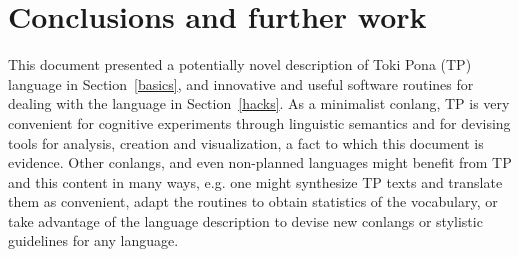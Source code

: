 \section{Conclusions and further work}\label{conc}
This document presented a potentially novel description of Toki Pona (TP)
language in Section~\ref{basics}, and innovative and useful software routines for dealing with
the language in Section~\ref{hacks}.
As a minimalist conlang, TP is very convenient for cognitive
experiments
through linguistic semantics and
for devising tools for analysis, creation and visualization,
a fact to which this document is evidence.
Other conlangs, and even non-planned languages might benefit from
TP and this content in many ways, e.g. one might
synthesize TP texts and translate them as convenient,
adapt the routines to obtain statistics of the vocabulary,
or take advantage of the language description to devise new conlangs
or stylistic guidelines for any language.

